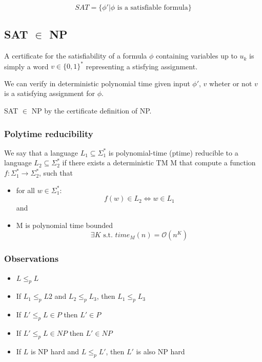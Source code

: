 \documentclass[a4paper,12pt]{article}
\theoremstyle{definition}
\theoremstyle{remark}
\begin{document}
\begin{equation*}
    SAT = \{\phi' | \phi \text{ is a satisfiable formula}\}
\end{equation*}

\subsection*{SAT $\in$ NP}

A certificate for the satisfiability of a formula $\phi$ containing variables up to $u_k$ is simply a word $v \in \{0, 1\}^*$
representing a stisfying assignment.

We can verify in deterministic polynomial time given input $\phi'$, $v$ wheter or not $v$ is a satisfying assignment for $\phi$.

SAT $\in$ NP by the certificate definition of NP.

\subsubsection*{Polytime reducibility}
We say that a language $L_1 \subseteq \Sigma_1^*$ is polynomial-time (ptime) reducible to a language $L_2 \subseteq \Sigma_2^*$ if there exists
a deterministic TM M that compute a function $f: \Sigma_1^* \to \Sigma_2^*$, such that
\begin{itemize}
    \item for all $w \in \Sigma_1^*$:
    \begin{equation*}
        f(w) \in L_2 \iff w \in L_1
    \end{equation*} and
    \item M is polynomial time bounded
    \begin{equation*}
        \exists K \text{ s.t. } time_M(n) = \mathscr{O}(n^K)
    \end{equation*}
\end{itemize}

\subsubsection*{Observations}
\begin{itemize}
    \item $L \leq_p L$
    \item If $L_1 \leq_p L2$ and $L_2 \leq_p L_3$, then $L_1 \leq_p L_3$
    \item If $L' \leq_p L \in P$ then $L' \in P$
    \item If $L' \leq_p L \in NP$ then $L' \in NP$
    \item If $L$ is NP hard and $L \leq_p L'$, then $L'$ is also NP hard
\end{itemize}
\end{document}

